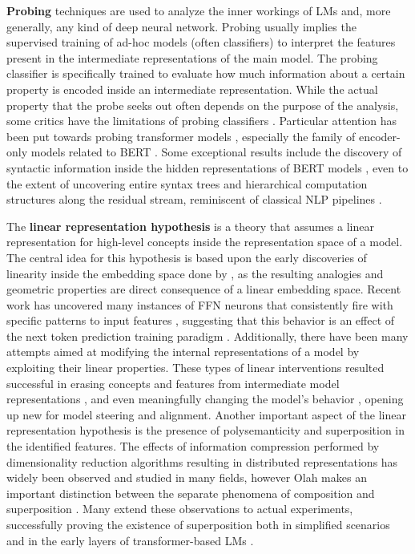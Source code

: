 \textbf{Probing} techniques are used to analyze the inner workings of LMs and, more generally, any kind of deep neural network.
Probing usually implies the supervised training of ad-hoc models (often classifiers) to interpret the features present in the intermediate representations of the main model.
The probing classifier is specifically trained to evaluate how much information about a certain property is encoded inside an intermediate representation.
While the actual property that the probe seeks out often depends on the purpose of the analysis, some critics have  the limitations of probing classifiers \cite{belinkov2022}.
Particular attention has been put towards probing transformer models \cite{chwang2024, zou2023, macdiarmid2024, burns2023}, especially the family of encoder-only models related to BERT \cite{devlin2019}.
Some exceptional results include the discovery of syntactic information inside the hidden representations of BERT models \cite{tenney2019a, lin2019, liu2019}, even to the extent of uncovering entire syntax trees \cite{hewitt2019} and hierarchical computation structures along the residual stream, reminiscent of classical NLP pipelines \cite{tenney2019b}.


The \textbf{linear representation hypothesis} \cite{park2023} is a theory that assumes a linear representation for high-level concepts inside the representation space of a model.
The central idea for this hypothesis is based upon the early discoveries of linearity inside the embedding space done by \citet{mikolov2013}, as the resulting analogies and geometric properties are direct consequence of a linear embedding space.
Recent work has uncovered many instances of FFN neurons that consistently fire with specific patterns  to input features \cite{voita2024}, suggesting that this behavior is an effect of the next token prediction training paradigm \cite{jiang2024}.
Additionally, there have been many attempts aimed at modifying the internal representations of a model by exploiting their linear properties.
These types of linear interventions resulted successful in erasing concepts and features from intermediate model representations \cite{ravfogel2020, ravfogel2022, belrose2023b}, and even meaningfully changing the model's behavior \cite{nanda2023, belrose2023b}, opening up new  for model steering and alignment. 
Another important aspect of the linear representation hypothesis is the presence of polysemanticity and superposition in the identified features.
The effects of information compression performed by dimensionality reduction algorithms resulting in distributed representations has widely been observed and studied in many fields, however Olah makes an important distinction between the separate phenomena of composition and superposition \cite{olah2023}.
Many extend these observations to actual experiments, successfully proving the existence of superposition both in simplified scenarios \cite{elhage2022, arora2018} and in the early layers of transformer-based LMs \cite{gurnee2023}.

